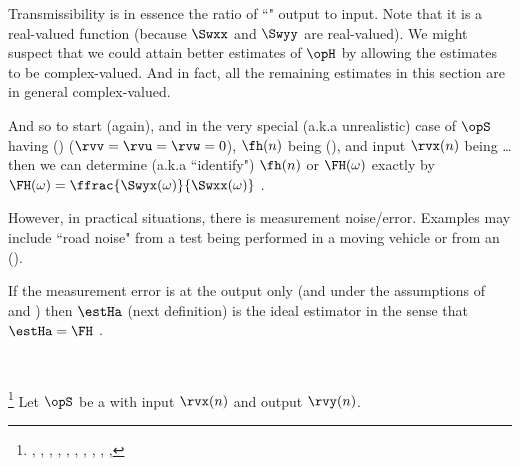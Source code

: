 Transmissibility is in essence the ratio of ``"  
output to  input.
Note that it is a real-valued function (because $\Swxx$ and $\Swyy$ are real-valued).
We might suspect that we could attain better estimates of $\opH$ by allowing the estimates to be complex-valued. %
And in fact, all the remaining estimates in this section are in general complex-valued.

And so to start (again), and in the very special (a.k.a unrealistic) case of $\opS$ having 
 ()
($\rvv=\rvu=\rvw=0$),
$\fh(n)$ being  (),
and input $\rvx(n)$ being \ldots
then we can determine (a.k.a ``identify") $\fh(n)$ or $\FH(\omega)$
exactly by $\FH(\omega)=\ffrac{\Swyx(\omega)}{\Swxx(\omega)}$ .

However, in practical situations, there is measurement noise/error. %
Examples may include
``road noise" from a test being performed in a moving vehicle or  from an 
 ().

\begin{minipage}{\tw-70mm}
If the measurement error is at the output only (and under the assumptions of  and )
then $\estHa$ (next definition) is the ideal estimator in the sense that $\estHa=\FH$ .
\end{minipage}
\hfill{}
\\
\begin{definition}
\footnote{
  ,
  ,
  ,
  ,
  ,
  ,
  ,
  ,
  ,
  ,
  }
\label{def:H1}
Let $\opS$ be a  with input $\rvx(n)$ and output $\rvy(n)$.
\end{definition}


